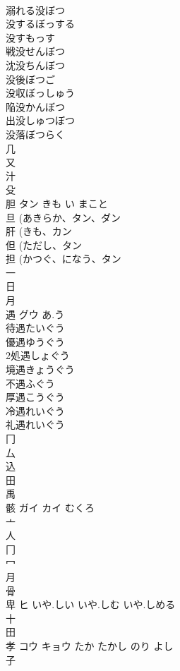 \documentclass[8pt]{extreport}
\begin{document}
\begin{CJK}{UTF8}{min}
\\	溺れる没ぼつ
\\	没するぼっする
\\	没すもっす
\\	戦没せんぼつ
\\	沈没ちんぼつ
\\	没後ぼつご
\\	没収ぼっしゅう
\\	陥没かんぼつ
\\	出没しゅつぼつ
\\	没落ぼつらく
\\	几 
\\	又 
\\	汁 
\\	殳 
\\	胆	タン	きも い まこと	
\\	旦 (あきらか、タン、ダン 
\\	肝 (きも、カン 
\\	但 (ただし、タン 
\\	担 (かつぐ、になう、タン 
\\	一 
\\	日 
\\	月 
\\	遇	グウ	あ.う	
\\	待遇たいぐう
\\	優遇ゆうぐう
\\	2処遇しょぐう
\\	境遇きょうぐう
\\	不遇ふぐう
\\	厚遇こうぐう
\\	冷遇れいぐう
\\	礼遇れいぐう
\\	冂 
\\	厶 
\\	込 
\\	田 
\\	禹 
\\	骸	ガイ カイ	むくろ	
\\	亠 
\\	人 
\\	冂 
\\	冖 
\\	月 
\\	骨 
\\	卑	ヒ	いや.しい いや.しむ いや.しめる	
\\	十 
\\	田 
\\	孝	コウ キョウ	たか たかし のり よし	
\\	子 

\end{CJK}
\end{document}
